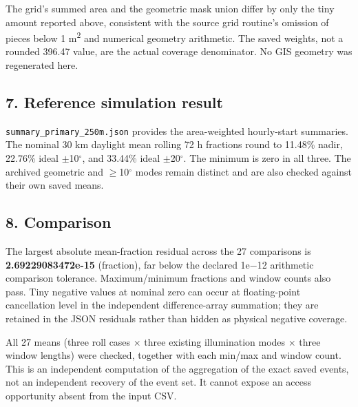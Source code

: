 \documentclass[10pt,a4paper]{article}
\numberwithin{equation}{section}
\begin{document}
\begin{sloppypar}The grid's summed area and the geometric mask union differ by only the tiny amount reported above, consistent with the source grid routine's omission of pieces below 1 m\textsuperscript{2} and numerical geometry arithmetic. The saved weights, not a rounded 396.47 value, are the actual coverage denominator. No GIS geometry was regenerated here.\end{sloppypar}


\subsection*{7. Reference simulation result}
\begin{sloppypar}\cite{S06} \nolinkurl{summary_primary_250m.json} provides the area-weighted hourly-start summaries. The nominal 30 km daylight mean rolling 72 h fractions round to 11.48\% nadir, 22.76\% ideal \ensuremath{\pm}10\ensuremath{{}^{\circ}}, and 33.44\% ideal \ensuremath{\pm}20\ensuremath{{}^{\circ}}. The minimum is zero in all three. The archived geometric and \ensuremath{\ge}10\ensuremath{{}^{\circ}} modes remain distinct and are also checked against their own saved means.\end{sloppypar}


\subsection*{8. Comparison}

\begin{sloppypar}The largest absolute mean-fraction residual across the 27 comparisons is \textbf{2.69229083472e-15} (fraction), far below the declared 1e\ensuremath{-}12 arithmetic comparison tolerance. Maximum/minimum fractions and window counts also pass. Tiny negative values at nominal zero can occur at floating-point cancellation level in the independent difference-array summation; they are retained in the JSON residuals rather than hidden as physical negative coverage.\end{sloppypar}


\begin{sloppypar}All 27 means (three roll cases \ensuremath{\times} three existing illumination modes \ensuremath{\times} three window lengths) were checked, together with each min/max and window count. This is an independent computation of the aggregation of the exact saved events, not an independent recovery of the event set. It cannot expose an access opportunity absent from the input CSV.\end{sloppypar}
\end{document}
